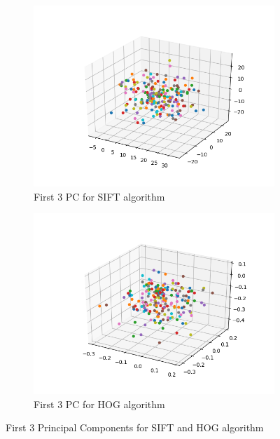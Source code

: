 \begin{figure}[H]
\begin{subfigure}{.5\textwidth}
  \centering
  \includegraphics[width=.8\linewidth]{PCA_sift_3d.png}
  \caption{First 3 PC for SIFT algorithm}
  \label{fig:PCA_sift_3d}
\end{subfigure}%
\begin{subfigure}{.5\textwidth}
  \centering
  \includegraphics[width=.8\linewidth]{PCA_HOG_3d.png}
  \caption{First 3 PC for HOG algorithm}
  \label{fig:PCA_hog_3d}
\end{subfigure}
\caption{First 3 Principal Components for SIFT and HOG algorithm}
\label{fig:PCA_3d}
\end{figure}

